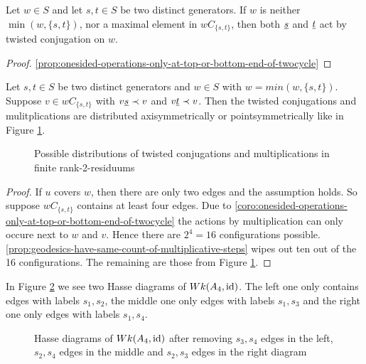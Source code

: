 \begin{coro}
	Let $w \in S$ and let $s,t \in S$ be two distinct generators. If $w$ is neither $\min(w,\{s,t\})$, nor a maximal element in $wC_{\{s,t\}}$, then both $\underline{s}$ and $\underline{t}$ act by twisted conjugation on $w$.

	\begin{proof}
		\ref{prop:onesided-operations-only-at-top-or-bottom-end-of-twocycle} \todo
	\end{proof}
\end{coro}

\begin{lemm}
	Let $s,t \in S$ be two distinct generators and $w \in S$ with $w = min(w,\{s,t\})$. Suppose $v \in wC_{\{s,t\}}$ with $v \underline{s} \prec v$ and $v \underline{t} \prec v$. Then the twisted conjugations and mulitplications are distributed axisymmetrically or pointsymmetrically like in Figure \ref{fig:dist-one-bothsided-actions-in-rank-2-residuum}.

	\begin{figure}[ht]
		\centering
		
		
		
		
		
		
		\caption{Possible distributions of twisted conjugations and multiplications in finite rank-2-residuums}
		\label{fig:dist-one-bothsided-actions-in-rank-2-residuum}
	\end{figure}

	\begin{proof}
		If $u$ covers $w$, then there are only two edges and the assumption holds. So suppose $wC_{\{s,t\}}$ contains at least four edges. Due to \ref{coro:onesided-operations-only-at-top-or-bottom-end-of-twocycle} the actions by multiplication can only occure next to $w$ and $v$. Hence there are $2^4 = 16$ configurations possible. \ref{prop:geodesics-have-same-count-of-multiplicative-steps} wipes out ten out of the 16 configurations. The remaining are those from Figure \ref{fig:dist-one-bothsided-actions-in-rank-2-residuum}.
	\end{proof}
\end{lemm}

\begin{exam}
	In Figure \ref{fig:a4_s1s3-and-a4_s2s4} we see two Hasse diagrams of $Wk(A_4, \operatorname{id})$. The left one only contains edges with labels $s_1,s_2$, the middle one only edges with labels $s_1,s_3$ and the right one only edges with labels $s_1,s_4$.
	\begin{figure}[ht]
		\centering
		
		\quad \quad
		
		\quad \quad
		
		\caption{Hasse diagrams of $Wk(A_4, \operatorname{id})$ after removing $s_3,s_4$ edges in the left, $s_2,s_4$ edges in the middle and $s_2,s_3$ edges in the right diagram}
		\label{fig:a4_s1s3-and-a4_s2s4}
	\end{figure}
\end{exam}

